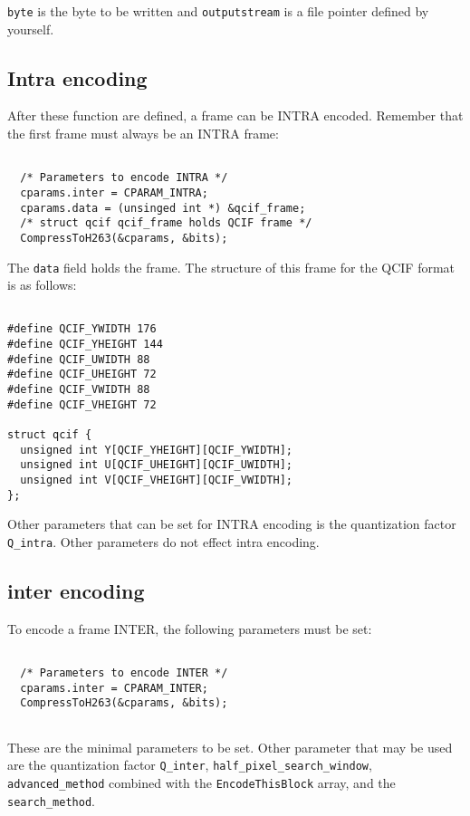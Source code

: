 \documentclass{article}
\begin{document}
\texttt{byte} is the byte to be written and \texttt{outputstream} is a file pointer defined by yourself. 

\subsection{Intra encoding}

After these function are defined, a frame can be INTRA
encoded. Remember that the first frame must always be an INTRA frame:

\begin{verbatim}

  /* Parameters to encode INTRA */
  cparams.inter = CPARAM_INTRA;  
  cparams.data = (unsinged int *) &qcif_frame; 
  /* struct qcif qcif_frame holds QCIF frame */
  CompressToH263(&cparams, &bits);

\end{verbatim}

The \texttt{data} field holds the frame. The structure of this frame
for the QCIF format is as follows:

\begin{verbatim}

#define QCIF_YWIDTH 176
#define QCIF_YHEIGHT 144
#define QCIF_UWIDTH 88
#define QCIF_UHEIGHT 72
#define QCIF_VWIDTH 88
#define QCIF_VHEIGHT 72

struct qcif {
  unsigned int Y[QCIF_YHEIGHT][QCIF_YWIDTH];
  unsigned int U[QCIF_UHEIGHT][QCIF_UWIDTH];
  unsigned int V[QCIF_VHEIGHT][QCIF_VWIDTH];
};

\end{verbatim}

Other parameters that can be set for INTRA encoding is the
quantization factor \texttt{Q\_intra}. Other parameters do not effect intra
encoding.

\subsection{inter encoding}

To encode a frame INTER, the following parameters must be set:

\begin{verbatim}

  /* Parameters to encode INTER */
  cparams.inter = CPARAM_INTER;
  CompressToH263(&cparams, &bits);
 
\end{verbatim}

These are the minimal parameters to be set. Other parameter that may
be used are the quantization factor \texttt{Q\_inter},
\texttt{half\_pixel\_search\_window}, \texttt{advanced\_method}
combined with the \texttt{EncodeThisBlock} array, and the
\texttt{search\_method}.
\end{document}
